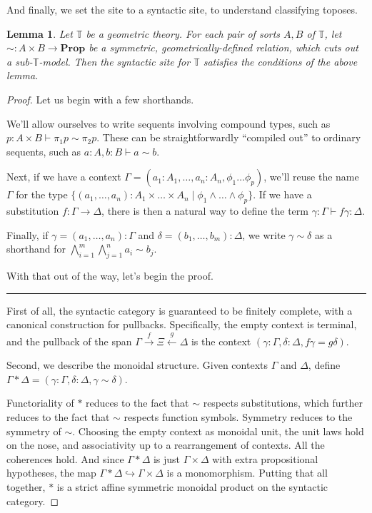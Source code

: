 \documentclass{article}
\newtheorem{lemma}[theorem]{Lemma}
\newcommand*{\T}{\mathbb{T}}
\begin{document}
And finally, we set the site to a syntactic site, to understand classifying toposes.

\begin{lemma}
    Let \(\T\) be a geometric theory.
    For each pair of sorts \(A,B\) of \(\T\), let \(\sim : A \times B \to \mathbf{Prop}\) be a symmetric, geometrically-defined relation, which cuts out a sub-\(\T\)-model.
    Then the syntactic site for \(\T\) satisfies the conditions of the above lemma.
\end{lemma}

\begin{proof}
    Let us begin with a few shorthands.

    We'll allow ourselves to write sequents involving compound types, such as \(p : A \times B \vdash \pi_1 p \sim \pi_2 p\).
    These can be straightforwardly ``compiled out'' to ordinary sequents, such as \(a : A, b : B \vdash a \sim b\).

    Next, if we have a context \(\Gamma = (a_1 : A_1, \dots, a_n : A_n, \phi_1 \dots \phi_p)\),
    we'll reuse the name \(\Gamma\) for the type \(\{(a_1, \dots, a_n) : A_1 \times \dots \times A_n \mid \phi_1 \land \dots \land \phi_p\}\).
    If we have a substitution \(f : \Gamma \to \Delta\), there is then a natural way to define the term \(\gamma : \Gamma \vdash f\gamma : \Delta\).

    Finally, if \(\gamma = (a_1, \dots, a_n) : \Gamma\) and \(\delta = (b_1, \dots, b_m) : \Delta\),
    we write \(\gamma \sim \delta\) as a shorthand for \(\bigwedge_{i=1}^m \bigwedge_{j=1}^n a_i \sim b_j\).

    With that out of the way, let's begin the proof.

    \vspace*{1em}\hrule\vspace*{1em}

    First of all, the syntactic category is guaranteed to be finitely complete, with a canonical construction for pullbacks.
    Specifically, the empty context is terminal,
    and the pullback of the span \(\Gamma \xrightarrow{f} \Xi \xleftarrow{g} \Delta\) is the context \((\gamma : \Gamma, \delta : \Delta, f\gamma = g\delta)\).

    Second, we describe the monoidal structure. Given contexts \(\Gamma\) and \(\Delta\),
    define \(\Gamma * \Delta = (\gamma : \Gamma, \delta : \Delta, \gamma \sim \delta)\).

    Functoriality of \(*\) reduces to the fact that \(\sim\) respects substitutions, which further reduces to the fact that \(\sim\) respects function symbols.
    Symmetry reduces to the symmetry of \(\sim\). Choosing the empty context as monoidal unit, the unit laws hold on the nose, and associativity up to a rearrangement of contexts.
    All the coherences hold.
    And since \(\Gamma * \Delta\) is just \(\Gamma \times \Delta\) with extra propositional hypotheses,
    the map \(\Gamma * \Delta \hookrightarrow \Gamma \times \Delta\) is a monomorphism.
    Putting that all together, \(*\) is a strict affine symmetric monoidal product on the syntactic category.


\end{proof}
\end{document}
